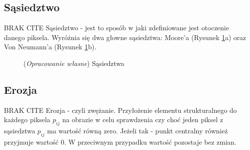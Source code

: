 \documentclass{article}
\begin{document}
        \newpage
        \subsection{Sąsiedztwo}
        {
            BRAK CITE
            \label{sec:sasiedztwo}
            \Large
            \justifying
            \quad
            Sąsiedztwo - jest to sposób w jaki zdefiniowane jest otoczenie danego piksela.
            Wyróżnia się dwa głowne sąsiedztwa: Moore'a (Rysunek \ref{neighbourhood}a) oraz Von Neumann'a (Rysunek \ref{neighbourhood}b).
        }
        \begin{figure}[H]
            \centering
            \qquad
            \caption{(\textit{Opracowanie własne}) Sąsiedztwa}
            \label{neighbourhood}
        \end{figure}

        \subsection{Erozja}
        {
            BRAK CITE
            \label{sec:erozja}
            \Large
            \justifying
            \quad
            Erozja - czyli zwężanie.
            Przyłożenie elementu strukturalnego do każdego piksela \(p_{ij}\) na obrazie w celu sprawdzenia czy choć jeden piksel z sąsiedztwa \(p_{ij}\) ma wartość równą zero.
            Jeżeli tak - punkt centralny również przyjmuje wartość 0. W przeciwnym przypadku wartość pozostaje bez zmian.
        }
\end{document}
